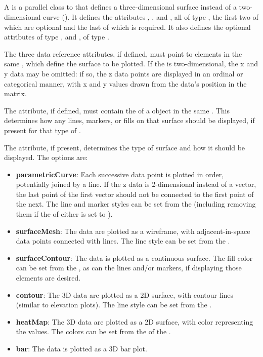 \subsection{}
\label{class:surface}
\begin{blockChanged}
A \Surface is a parallel class to \AbstractCurve that defines a three-dimensional surface instead of a two-dimensional curve ().  It defines the attributes , , and , all of type , the first two of which are optional and the last of which is required.  It also defines the optional attributes  of type , and , of type \SurfaceKind.

The three data reference attributes, if defined, must point to \DataGenerator elements in the same \SedDocument, which define the surface to be plotted.  If the  is two-dimensional, the x and y data may be omitted: if so, the z data points are displayed in an ordinal or categorical manner, with x and y values drawn from the data's position in the matrix.

The  attribute, if defined, must contain the  of a \Style object in the same \SedDocument.  This \Style determines how any lines, markers, or fills on that surface should be displayed, if present for that type of \Surface.

The  attribute, if present, determines the type of surface and how it should be displayed.  The options are:

\begin{itemize}
\item \textbf{parametricCurve}: Each successive data point is plotted in order, potentially joined by a line.  If the z data is 2-dimensional instead of a vector, the last point of the first vector should not be connected to the first point of the next.  The line and marker styles can be set from the  (including removing them if the  of either is set to ).
\item \textbf{surfaceMesh}: The data are plotted as a wireframe, with adjacent-in-space data points connected with lines.  The line style can be set from the .
\item \textbf{surfaceContour}: The data is plotted as a continuous surface.  The fill color can be set from the , as can the lines and/or markers, if displaying those elements are desired.
\item \textbf{contour}:  The 3D data are plotted as a 2D surface, with contour lines (similar to elevation plots).  The line style can be set from the .
\item \textbf{heatMap}:  The 3D data are plotted as a 2D surface, with color representing the values.  The colors can be set from the  of the .
\item \textbf{bar}: The data is plotted as a 3D bar plot.
\end{itemize}


\end{blockChanged}
